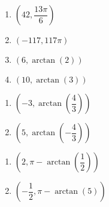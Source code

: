 \begin{multicols}{4} 

\begin{enumerate}

\setcounter{enumi}{\value{HW}}

\item $\left( 42, \dfrac{13\pi}{6} \right)$
\item $\left( -117, 117\pi \right)$ 
\item $\left( 6, \arctan(2) \right)$ 
\item $\left(10, \arctan(3) \right)$ 

\setcounter{HW}{\value{enumi}}

\end{enumerate}

\end{multicols}

\begin{multicols}{2} 

\begin{enumerate}

\setcounter{enumi}{\value{HW}}

\item $\left( -3, \arctan\left(\dfrac{4}{3}\right) \right)$ 
\item $\left( 5, \arctan\left(-\dfrac{4}{3}\right) \right)$ 

\setcounter{HW}{\value{enumi}}

\end{enumerate}

\end{multicols}

\begin{multicols}{2} 

\begin{enumerate}

\setcounter{enumi}{\value{HW}}

\item $\left( 2, \pi - \arctan\left(\dfrac{1}{2}\right)  \right)$ 
\item $\left( -\dfrac{1}{2}, \pi - \arctan\left(5\right)  \right)$ 

\setcounter{HW}{\value{enumi}}

\end{enumerate}

\end{multicols}

